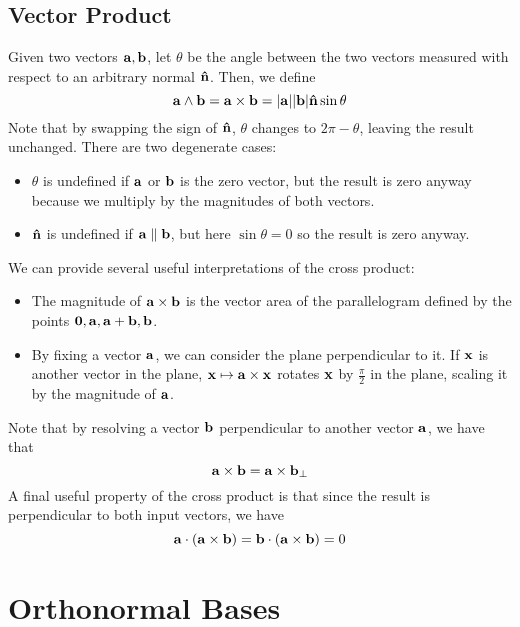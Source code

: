 \documentclass{article}
\begin{document}
\subsection{Vector Product}
\begin{definition}
	Given two vectors $\vb a, \vb b$, let $\theta$ be the angle between the two vectors measured with respect to an arbitrary normal $\vb{\hat n}$. Then, we define
	\[ \vb a \wedge \vb b = \vb a \times \vb b = \abs{\vb a} \abs{\vb b} \vb{\hat n} \sin \theta \]
	Note that by swapping the sign of $\vb{\hat n}$, $\theta$ changes to $2 \pi - \theta$, leaving the result unchanged. There are two degenerate cases:
	\begin{itemize}
		\item $\theta$ is undefined if $\vb a$ or $\vb b$ is the zero vector, but the result is zero anyway because we multiply by the magnitudes of both vectors.
		\item $\vb{\hat n}$ is undefined if $\vb a \parallel \vb b$, but here $\sin \theta = 0$ so the result is zero anyway.
	\end{itemize}
\end{definition}
We can provide several useful interpretations of the cross product:
\begin{itemize}
	\item The magnitude of $\vb a \times \vb b$ is the vector area of the parallelogram defined by the points $\vb 0, \vb a, \vb a + \vb b, \vb b$.
	\item By fixing a vector $\vb a$, we can consider the plane perpendicular to it. If $\vb x$ is another vector in the plane, $\vb x \mapsto \vb a \times \vb x$ rotates $\vb x$ by $\frac{\pi}{2}$ in the plane, scaling it by the magnitude of $\vb a$.
\end{itemize}
Note that by resolving a vector $\vb b$ perpendicular to another vector $\vb a$, we have that
\[ \vb a \times \vb b = \vb a \times \vb b_\perp \]
A final useful property of the cross product is that since the result is perpendicular to both input vectors, we have
\[ \vb a \cdot (\vb a \times \vb b) = \vb b \cdot(\vb a \times \vb b) = 0 \]

\section{Orthonormal Bases}
\end{document}
